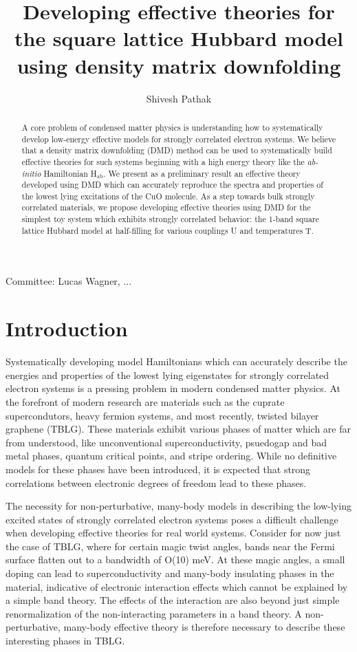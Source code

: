\documentclass[12pt]{article}
\author{Shivesh Pathak}
\title{Developing effective theories for the square lattice Hubbard model using density matrix downfolding}
\begin{document}
\maketitle
\begin{abstract}
A core problem of condensed matter physics is understanding how to systematically develop low-energy effective models for strongly correlated electron systems. 
We believe that a density matrix downfolding (DMD) method can be used to systematically build effective theories for such systems beginning with a high energy theory like the \textit{ab-initio} Hamiltonian H$_\text{ab}$.
We present as a preliminary result an effective theory developed using DMD which can accurately reproduce the spectra and properties of the lowest lying excitations of the CuO molecule.
As a step towards bulk strongly correlated materials, we propose developing effective theories using DMD for the simplest toy system which exhibits strongly correlated behavior: the 1-band square lattice Hubbard model at half-filling for various couplings U and temperatures T.
\end{abstract}
Committee: Lucas Wagner, ...
\pagebreak

\section{Introduction}
Systematically developing model Hamiltonians which can accurately describe the energies and properties of the lowest lying eigenstates for strongly correlated electron systems is a pressing problem in modern condensed matter physics. 
At the forefront of modern research are materials such as the cuprate supercondutors, heavy fermion systems, and most recently, twisted bilayer graphene (TBLG).
These materials exhibit various phases of matter which are far from understood, like unconventional superconductivity, psuedogap and bad metal phases, quantum critical points, and stripe ordering.
While no definitive models for these phases have been introduced, it is expected that strong correlations between electronic degrees of freedom lead to these phases.

The necessity for non-perturbative, many-body models in describing the low-lying excited states of strongly correlated electron systems poses a difficult challenge when developing effective theories for real world systems.
Consider for now just the case of TBLG, where for certain magic twist angles, bands near the Fermi surface flatten out to a bandwidth of O(10) meV.
At these magic angles, a small doping can lead to superconductivity and many-body insulating phases in the material, indicative of electronic interaction effects which cannot be explained by a simple band theory.
The effects of the interaction are also beyond just simple renormalization of the non-interacting parameters in a band theory.
A non-perturbative, many-body effective theory is therefore necessary to describe these interesting phases in TBLG.
\end{document}
